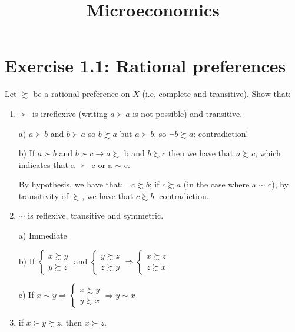 \documentclass[11pt]{article} %
\title{Microeconomics }
\begin{document}
\maketitle


\section*{Exercise 1.1: Rational preferences }



Let $\succsim$ be a rational preference on $X$ (i.e. complete and transitive). Show that:


\begin{enumerate}

\item $\succ$ is irreflexive (writing $a \succ a$ is not possible) and transitive.

a)
$a \succ b$ and  $b\succ a$
so $b \succsim a$ but $a \succ b$, so $\neg b \succsim a$: contradiction!

b) If  $a \succ b$ 
and $b \succ c \rightarrow a \succsim$ b 
and $b \succsim c $
then we have that $ a \succsim c$, which indicates that a $\succ$ c or  a $\sim$ c.

By hypothesis, we have that: $\neg c \succsim  b$; if $c\succsim a$ (in the case where a $\sim$ c), by transitivity of $\succsim$, we have that  $c \succsim b$: contradiction. 

\item $\sim$ is reflexive, transitive and symmetric.

a) Immediate


b) If $\begin{cases}
x \succsim y \\
y \succsim z
\end{cases}$ and  
$\begin{cases} 
y \succsim z \\
z \succsim y 
\end{cases}
\Rightarrow 
\begin{cases}
x \succsim z \\
z \succsim x
\end{cases}$

c) If $x \sim y\Rightarrow
\begin{cases} 
x \succsim y \\
y \succsim x
\end{cases} \Rightarrow y \sim x$  

\item if $x \succ y \succsim z$, then $x \succ z$.

\end{enumerate}
\end{document}
